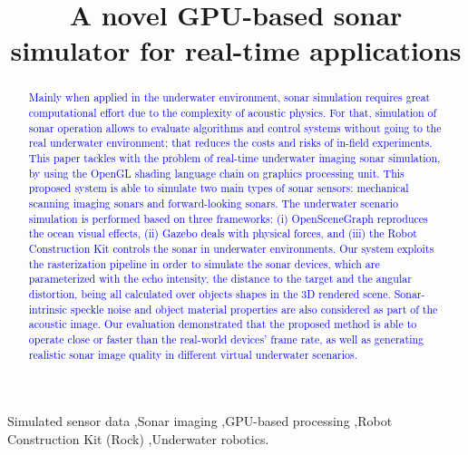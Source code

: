 \documentclass[final,5p,times]{elsarticle}
\begin{document}
\begin{frontmatter}


\title{A novel GPU-based sonar simulator for real-time applications}



\begin{abstract}

\textcolor{blue}{Mainly when applied in the underwater environment, sonar simulation requires great computational effort due to the complexity of acoustic physics. For that, simulation of sonar operation allows to evaluate algorithms and control systems without going to the real underwater environment; that reduces the costs and risks of in-field experiments. This paper tackles with the problem of real-time underwater imaging sonar simulation, by using the OpenGL shading language chain on graphics processing unit. This proposed system is able to simulate two main types of sonar sensors: mechanical scanning imaging sonars and forward-looking sonars. The underwater scenario simulation is performed based on three frameworks: (i) OpenSceneGraph reproduces the ocean visual effects, (ii) Gazebo deals with physical forces, and (iii) the Robot Construction Kit controls the sonar in underwater environments. Our system exploits the rasterization pipeline in order to simulate the sonar devices, which are parameterized with the echo intensity, the distance to the target and the angular distortion, being all calculated over objects shapes in the 3D rendered scene. Sonar-intrinsic speckle noise and object material properties are also considered as part of the acoustic image. Our evaluation demonstrated that the proposed method is able to operate close or faster than the real-world devices' frame rate, as well as generating realistic sonar image quality in different virtual underwater scenarios.}

\end{abstract}

\begin{keyword}
Simulated sensor data
\sep Sonar imaging
\sep GPU-based processing
\sep Robot Construction Kit (Rock)
\sep Underwater robotics.

\end{keyword}

\end{frontmatter}
\end{document}
